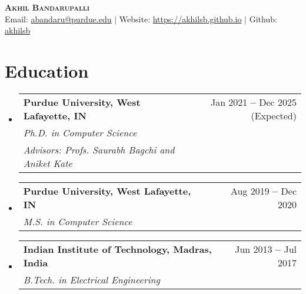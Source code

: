 \documentclass[letterpaper,11pt]{article}
\makeatletter
\newcommand{\resumeSubheading}[4]{
  \vspace{-2pt}\item
    \begin{tabular*}{0.97\textwidth}[t]{l@{\extracolsep{\fill}}r}
      \textbf{#1} & #2 \\
      \textit{\small#3} & \textit{\small #4} \\
    \end{tabular*}\vspace{-7pt}
}
\newcommand{\resumeEducationHeading}[6]{
  \vspace{-2pt}\item
    \begin{tabular*}{0.97\textwidth}[t]{l@{\extracolsep{\fill}}r}
      \textbf{#1} & #2 \\
      \textit{\small#3} & \textit{\small #4} \\
      \textit{\small#5} & \textit{\small #6} \\
    \end{tabular*}\vspace{-5pt}
}
\newcommand{\resumeSubHeadingListStart}{\begin{itemize}[leftmargin=0.15in, label={}]}
\newcommand{\resumeSubHeadingListEnd}{\end{itemize}}
\makeatother
\begin{document}

\begin{center}
    \textbf{\Huge \scshape Akhil Bandarupalli} \\ \vspace{3pt}
    \small
    \faAt \hspace{.5pt} Email: \href{mailto:abandaru@purdue.edu}{abandaru@purdue.edu}
    $|$
    \faGlobe \hspace{.5pt} Website: \href{https://akhilsb.github.io}{https://akhilsb.github.io}
    $|$
    \faGithub \hspace{.5pt} Github: \href{https://github.com/akhilsb}{akhilsb}
\end{center}




\section{Education}
  \vspace{3pt}
  \resumeSubHeadingListStart
    
    \resumeEducationHeading
      {Purdue University, West Lafayette, IN
      }{Jan 2021 \textbf{--} Dec 2025 (Expected)}
      {Ph.D. in Computer Science}{}
      {Advisors: Profs. Saurabh Bagchi and  Aniket Kate}{}
      
      \resumeSubheading
      {Purdue University, West Lafayette, IN}{Aug 2019 \textbf{--} Dec 2020}
      {M.S. in Computer Science}{}
    
     \resumeSubheading
       {Indian Institute of Technology, Madras, India}{Jun 2013 \textbf{--} Jul 2017}
       {B.Tech. in Electrical Engineering}{}
    
  \resumeSubHeadingListEnd

\vspace{2pt}
\end{document}
